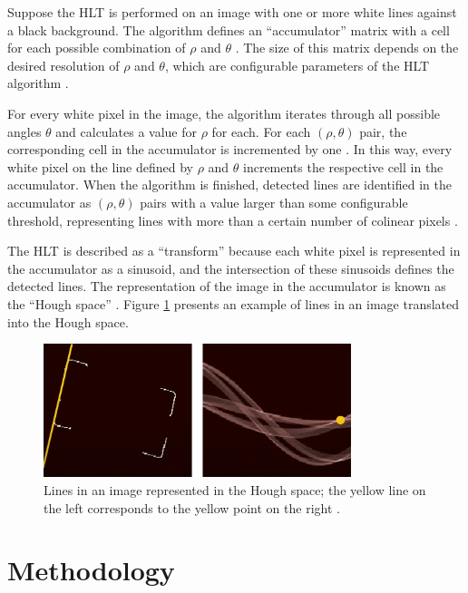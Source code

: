 Suppose the HLT is performed on an image with one or more white lines against a black background. The algorithm defines an ``accumulator'' matrix with a cell for each possible combination of $\rho$ and $\theta$ \cite{opencv_2023c}. The size of this matrix depends on the desired resolution of $\rho$ and $\theta$, which are configurable parameters of the HLT algorithm \cite{opencv_2023c}.

For every white pixel in the image, the algorithm iterates through all possible angles $\theta$ and calculates a value for $\rho$ for each. For each $(\rho,\theta)$ pair, the corresponding cell in the accumulator is incremented by one \cite{opencv_2023c}. In this way, every white pixel on the line defined by $\rho$ and $\theta$ increments the respective cell in the accumulator. When the algorithm is finished, detected lines are identified in the accumulator as $(\rho,\theta)$ pairs with a value larger than some configurable threshold, representing lines with more than a certain number of colinear pixels \cite{opencv_2023c}.

The HLT is described as a ``transform'' because each white pixel is represented in the accumulator as a sinusoid, and the intersection of these sinusoids defines the detected lines. The representation of the image in the accumulator is known as the ``Hough space'' \cite{opencv_2023c}. Figure \ref{fig:hough_line} presents an example of lines in an image translated into the Hough space.

\begin{figure}[ht]
  \centering
  \includegraphics[width=0.8\textwidth]{images/hough_transform.png}
  \caption{Lines in an image represented in the Hough space; the yellow line on the left corresponds to the yellow point on the right \cite{korting_2016}.}
  \label{fig:hough_line}
\end{figure}

\newpage
\section{Methodology}

